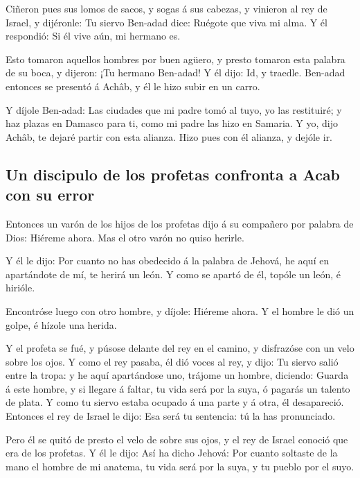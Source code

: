  Ciñeron pues sus lomos de sacos, y sogas á sus cabezas,
y vinieron al rey de Israel, y dijéronle: Tu siervo Ben-adad dice:
Ruégote que viva mi alma. Y él respondió: Si él vive aún, mi hermano es.

 Esto tomaron aquellos hombres por buen agüero, y presto
tomaron esta palabra de su boca, y dijeron: ¡Tu hermano Ben-adad! Y él
dijo: Id, y traedle. Ben-adad entonces se presentó á Achâb, y él le hizo
subir en un carro.

 Y díjole Ben-adad: Las ciudades que mi padre tomó al
tuyo, yo las restituiré; y haz plazas en Damasco para ti, como mi padre
las hizo en Samaria. Y yo, dijo Achâb, te dejaré partir con esta
alianza. Hizo pues con él alianza, y dejóle ir.

\hypertarget{un-discipulo-de-los-profetas-confronta-a-acab-con-su-error}{%
\subsection{Un discipulo de los profetas confronta a Acab con su
error}\label{un-discipulo-de-los-profetas-confronta-a-acab-con-su-error}}

 Entonces un varón de los hijos de los profetas dijo á su
compañero por palabra de Dios: Hiéreme ahora. Mas el otro varón no quiso
herirle.

 Y él le dijo: Por cuanto no has obedecido á la palabra
de Jehová, he aquí en apartándote de mí, te herirá un león. Y como se
apartó de él, topóle un león, é hirióle.

 Encontróse luego con otro hombre, y díjole: Hiéreme
ahora. Y el hombre le dió un golpe, é hízole una herida.

 Y el profeta se fué, y púsose delante del rey en el
camino, y disfrazóse con un velo sobre los ojos.  Y como
el rey pasaba, él dió voces al rey, y dijo: Tu siervo salió entre la
tropa: y he aquí apartándose uno, trájome un hombre, diciendo: Guarda á
este hombre, y si llegare á faltar, tu vida será por la suya, ó pagarás
un talento de plata.  Y como tu siervo estaba ocupado á
una parte y á otra, él desapareció. Entonces el rey de Israel le dijo:
Esa será tu sentencia: tú la has pronunciado.

 Pero él se quitó de presto el velo de sobre sus ojos, y
el rey de Israel conoció que era de los profetas.  Y él
le dijo: Así ha dicho Jehová: Por cuanto soltaste de la mano el hombre
de mi anatema, tu vida será por la suya, y tu pueblo por el suyo.

